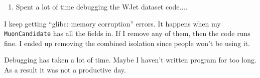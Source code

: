 

\begin{enumerate}
\item Spent a lot of time debugging the WJet dataset code....
\end{enumerate}


I keep getting ``glibc: memory corruption'' errors.  It happens when my \texttt{MuonCandidate} has all the fields in.
If I remove any of them, then the code runs fine.  I ended up removing the combined isolation since people won't be using it.


Debugging has taken a lot of time.  Maybe I haven't written program for too long.  As a result it was not a productive day.



